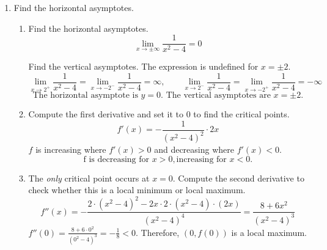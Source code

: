 \documentclass[a4paper, 12pt]{article}
\begin{document}
\begin{enumerate}[leftmargin=*,label=\textbf{\arabic*.}]
\begin{enumerate}[leftmargin=*,label=\textbf{\alph*.}]
\item Apply the chain rule accordingly.
\begin{equation*}f(x) = \tan\left( e^{2x}\sin(3x)\right)\end{equation*}
\begin{equation*}\boxed{f'(x) = \sec^2\left( e^{2x}\sin(3x)\right)\cdot\left[ e^{2x}\cdot 2\cdot\sin(3x) +  e^{2x}\cdot\cos(3x)\cdot3\right]}\end{equation*}

\item Compute the first and second derivatives, respectively, applying the chain rule and the quotient rule accordingly.
\begin{equation*}f(x) = \ln\left(\frac{x^2}{x^2+4}\right)\end{equation*}
\begin{equation*}f'(x)= \frac{x^2+4}{x^2}\cdot\frac{2x\cdot(x^2+4)-x^2\cdot2x}{\left(x^2+4\right)^2}=\frac{8}{x^3+4x}\end{equation*}
\begin{equation*}f''(x)= -\frac{8}{\left(x^3+4x\right)^2}\cdot\left(3x^2+4\right)=\boxed{-\frac{24x^2+32}{\left(x^3+4x\right)^2}}\end{equation*}
\end{enumerate}

\item Find the horizontal asymptotes.
\begin{enumerate}[leftmargin=*,label=\textbf{\alph*.}]
\item Find the horizontal asymptotes.
\[\lim_{x\to\pm\infty}\frac{1}{x^2-4}=0\]

Find the vertical asymptotes. The expression is undefined for $x=\pm2$.
\[\lim_{x\to2^+}\frac{1}{x^2-4}=\lim_{x\to-2^-}\frac{1}{x^2-4}=\infty,\qquad \lim_{x\to2^-}\frac{1}{x^2-4}=\lim_{x\to-2^+}\frac{1}{x^2-4}=-\infty\]
\[\boxed{\text{The horizontal asymptote is } y= 0. \text{ The vertical asymptotes are } x=\pm2.}\]

\item Compute the first derivative and set it to $0$ to find the critical points.
\[f'(x)=-\frac{1}{\left(x^2-4\right)^2}\cdot2x\]
$f$ is increasing where $f'(x)>0$ and decreasing where $f'(x)<0$.
\[\boxed{\text{f is decreasing for } x>0, \text{increasing for } x<0.}\]

\item The \textit{only} critical point occurs at $x=0$. Compute the second derivative to check whether this is a local minimum or local maximum.
\begin{equation*}f''(x)=-\frac{2\cdot\left(x^2-4\right)^2-2x\cdot2\cdot(x^2-4)\cdot(2x)}{\left(x^2-4\right)^4}=\frac{8+6x^2}{\left(x^2-4\right)^3}\end{equation*}
$\displaystyle f''(0)=\frac{8+6\cdot0^2}{\left(0^2-4\right)^3}=-\frac18<0$. Therefore, $(0, f(0))$  is a local maximum.


\end{enumerate}
\end{enumerate}
\end{document}
